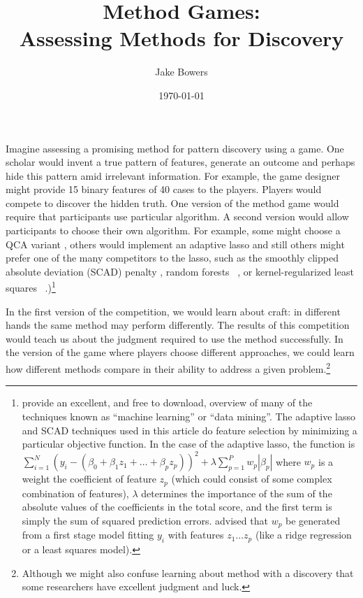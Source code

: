 \documentclass[12pt]{article}
\title{Method Games:\\ Assessing Methods for Discovery}
\author{Jake Bowers}
\date{\today}
\begin{document}
\maketitle

Imagine assessing a promising method for pattern discovery using a game.  One
scholar would invent a true pattern of features, generate an outcome and
perhaps hide this pattern amid irrelevant information.  For example, the game
designer might provide 15 binary features of 40 cases to the players. Players
would compete to discover the hidden truth.  One version of the method game
would require that participants use particular algorithm. A second version
would allow participants to choose their own algorithm. For example, some
might choose a QCA variant \citep{rihoux2008configurational}, others would
implement an adaptive lasso \citep{zou2006adaptive} and still others might
prefer one of the many competitors to the lasso, such as the smoothly clipped
absolute deviation (SCAD) penalty \citep{fan2001variable}, random forests
~\citep{breiman2001random}, or kernel-regularized least squares
~\citep{hainmueller2012kernel}.)\footnote{\citet{hasttibfried09} provide an
  excellent, and free to download, overview of many of the techniques known as
  ``machine learning'' or ``data mining''. The adaptive lasso and SCAD
  techniques used in this article do feature selection by minimizing a
  particular objective function. In the case of the adaptive lasso, the
  function is $\sum_{i=1}^N (y_i - ( \beta_0 + \beta_1 z_1 + \ldots + \beta_p
  z_p) )^2 + \lambda \sum_{p=1}^P w_p|\beta_p|$ where $w_p$ is a weight the
  coefficient of feature $z_p$ (which could consist of some complex
  combination of features), $\lambda$ determines the importance of the sum of
  the absolute values of the coefficients in the total score, and the first
  term is simply the sum of squared prediction errors. \citet{zou2006adaptive}
  advised that $w_p$ be generated from a first stage model fitting $y_i$ with
  features $z_1 \ldots z_p$ (like a ridge regression or a least squares
  model).    }

In the first version of the
competition, we would learn about craft: in different hands the same method
may perform differently. The results of this competition would teach us about
the judgment required to use the method successfully.  In the version of the
game where players choose different approaches, we could learn how different
methods compare in their ability to address a given problem.\footnote{Although
  we might also confuse learning about method with a discovery that some
  researchers have excellent judgment and luck.}
\end{document}
